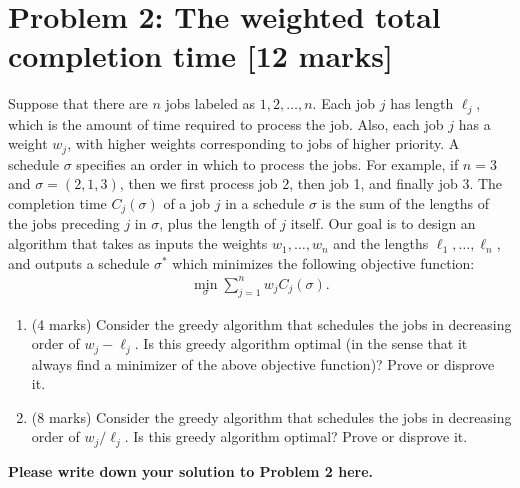 \documentclass[11pt,twoside]{article}
\newcommand{\problem}[1]{\section*{Problem #1}}
\newenvironment{solution}{{\par\noindent\it Solution.}}{}
\begin{document}
\problem{2: The weighted total completion time [12 marks]}
Suppose that there are $n$ jobs labeled as $1,2,\dots,n$. Each job $j$ has length $\ell_j$, which is the amount of time required to process the job. Also, each job $j$ has a weight $w_j$, with higher weights corresponding to jobs of higher priority. A schedule $\sigma$ specifies an order in which to process the jobs. For example, if $n=3$ and $\sigma=(2,1,3)$, then we first process job $2$, then job 1, and finally job $3$. The completion time $C_j(\sigma)$ of a job $j$ in a schedule $\sigma$ is the sum of the lengths of the jobs preceding $j$ in $\sigma$, plus the length of $j$ itself. Our goal is to design an algorithm that takes as inputs the weights $w_1,\dots,w_n$ and the lengths $\ell_1,\dots,\ell_n$, and outputs a schedule $\sigma^*$ which minimizes the following objective function:
\begin{align}
    \min\limits_{\sigma} \sum_{j=1}^n w_jC_j(\sigma).
\end{align}
\begin{enumerate}
    \item (4 marks) Consider the greedy algorithm that schedules the jobs in decreasing order of $w_j-\ell_j$. Is this greedy algorithm optimal (in the sense that it always find a minimizer of the above objective function)? Prove or disprove it.
    
    \item (8 marks) Consider the greedy algorithm that schedules the jobs in decreasing order of $w_j/\ell_j$. Is this greedy algorithm optimal? Prove or disprove it.
\end{enumerate}

\begin{solution}
\textbf{Please write down your solution to Problem 2 here.}
\end{solution}
\end{document}
